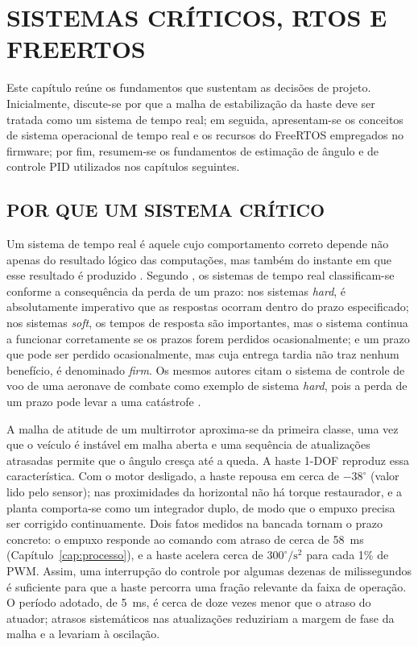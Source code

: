 \chapter{SISTEMAS CRÍTICOS, RTOS E FREERTOS}\label{cap:rtos}

Este capítulo reúne os fundamentos que sustentam as decisões de projeto. Inicialmente, discute-se por que a malha de estabilização da haste deve ser tratada como um sistema de tempo real; em seguida, apresentam-se os conceitos de sistema operacional de tempo real e os recursos do FreeRTOS empregados no firmware; por fim, resumem-se os fundamentos de estimação de ângulo e de controle PID utilizados nos capítulos seguintes.

\section{POR QUE UM SISTEMA CRÍTICO}

Um sistema de tempo real é aquele cujo comportamento correto depende não apenas do resultado lógico das computações, mas também do instante em que esse resultado é produzido \cite[p.~2]{burns2009}. Segundo , os sistemas de tempo real classificam-se conforme a consequência da perda de um prazo: nos sistemas \textit{hard}, é absolutamente imperativo que as respostas ocorram dentro do prazo especificado; nos sistemas \textit{soft}, os tempos de resposta são importantes, mas o sistema continua a funcionar corretamente se os prazos forem perdidos ocasionalmente; e um prazo que pode ser perdido ocasionalmente, mas cuja entrega tardia não traz nenhum benefício, é denominado \textit{firm}. Os mesmos autores citam o sistema de controle de voo de uma aeronave de combate como exemplo de sistema \textit{hard}, pois a perda de um prazo pode levar a uma catástrofe \cite[p.~3]{burns2009}.

A malha de atitude de um multirrotor aproxima-se da primeira classe, uma vez que o veículo é instável em malha aberta e uma sequência de atualizações atrasadas permite que o ângulo cresça até a queda. A haste 1-DOF reproduz essa característica. Com o motor desligado, a haste repousa em cerca de $-38^\circ$ (valor lido pelo sensor); nas proximidades da horizontal não há torque restaurador, e a planta comporta-se como um integrador duplo, de modo que o empuxo precisa ser corrigido continuamente. Dois fatos medidos na bancada tornam o prazo concreto: o empuxo responde ao comando com atraso de cerca de 58~ms (Capítulo~\ref{cap:processo}), e a haste acelera cerca de $300^\circ/\mathrm{s}^2$ para cada 1\% de PWM. Assim, uma interrupção do controle por algumas dezenas de milissegundos é suficiente para que a haste percorra uma fração relevante da faixa de operação. O período adotado, de 5~ms, é cerca de doze vezes menor que o atraso do atuador; atrasos sistemáticos nas atualizações reduziriam a margem de fase da malha e a levariam à oscilação.


